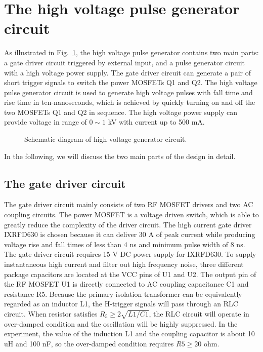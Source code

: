 \documentclass[aip,rsi,reprint,graphicx]{revtex4-1} %
\begin{document}
\section{The high voltage pulse generator circuit}
As illustrated in Fig.~\ref{Fig1}, the high voltage pulse generator contains two main parts: a gate driver circuit triggered by external input, and a pulse generator circuit with a high voltage power supply. The gate driver circuit can generate a pair of short trigger signals to switch the power MOSFETs Q1 and Q2. The high voltage pulse generator circuit is used to generate high voltage pulses with fall time and rise time in ten-nanoseconds, which is achieved by quickly turning on and off the two MOSFETs Q1 and Q2 in sequence. The high voltage power supply can provide voltage in range of $0\sim1$ kV with current up to 500 mA.

\begin{figure}[hbt]
\caption{Schematic diagram of high voltage generator circuit.\label{Fig1}}%
\end{figure}

In the following, we will discuss the two main parts of the design in detail.

\subsection{The gate driver circuit}
The gate driver circuit mainly consists of two RF MOSFET drivers and two AC coupling circuits.
 The power MOSFET is a voltage driven switch, which is able to greatly reduce the complexity of the driver circuit.
 The high current gate driver IXRFD630 is chosen because it can deliver 30 A of peak current while producing voltage rise and fall times of less than 4 ns and minimum pulse width of 8 ns.
 The gate driver circuit requires 15 V DC power supply for IXRFD630.
 To supply instantaneous high current and filter out high frequency noise, three different package capacitors are located at the VCC pins of U1 and U2.
	The output pin of the RF MOSFET U1 is directly connected to AC coupling capacitance C1 and resistance R5. Because the primary isolation transformer can be equivalently regarded as an inductor L1, the H-trigger signals will pass through an RLC circuit. When resistor satisfies $R_5\ge 2\sqrt{L1/C1}$, the RLC circuit will operate in over-damped condition and the oscillation will be highly suppressed. In the experiment, the value of the induction L1 and the coupling capacitor is about 10 uH and 100 nF, so the over-damped condition requires $R5\ge20$ ohm.
\end{document}

